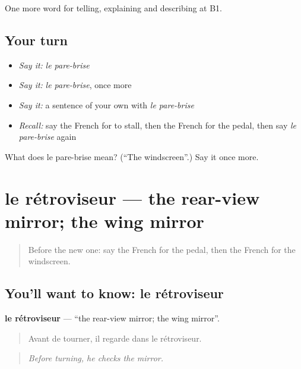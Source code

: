 \begin{grammarlens}[title={What you've built}]
One more word for telling, explaining and describing at B1.
\end{grammarlens}

\subsection*{Your turn}
\begin{itemize}
\raggedright
  \item \emph{Say it:} \emph{le pare-brise}
  \item \emph{Say it:} \emph{le pare-brise}, once more
  \item \emph{Say it:} a sentence of your own with \emph{le pare-brise}
  \item \emph{Recall:} say the French for to stall, then the French for the pedal, then say \emph{le pare-brise} again
\end{itemize}

\begin{tcolorbox}[breakable,colback=teal!4,colframe=teal!35!black,title={Before you move on}]
What does le pare-brise mean? (\textquotedblleft{}The windscreen\textquotedblright{}.) Say it once more.
\end{tcolorbox}
\section[le rétroviseur]{le rétroviseur — the rear-view mirror; the wing mirror}

\label{lesson:FR-C402-retroviseur}



\begin{quote}
Before the new one: say the French for the pedal, then the French for the windscreen.
\end{quote}

\subsection*{You'll want to know: le rétroviseur}
\textbf{le rétroviseur} — \textquotedblleft{}the rear-view mirror; the wing mirror\textquotedblright{}.

\begin{quote}
Avant de tourner, il regarde dans le rétroviseur.
\end{quote}

\begin{quote}
\emph{Before turning, he checks the mirror.}
\end{quote}

